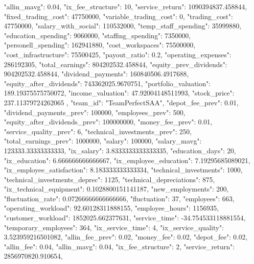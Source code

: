 {{            "allin_mavg": 0.04,
            "ix_fee_structure": 10,
            "service_return": 1090394837.458844,
            "fixed_trading_cost": 47750000,
            "variable_trading_cost": 0,
            "trading_cost": 47750000,
            "salary_with_social": 110532000,
            "temp_staff_spending": 35999880,
            "education_spending": 9060000,
            "staffing_spending": 7350000,
            "personell_spending": 162941880,
            "cost_workspaces": 75500000,
            "cost_infrastructure": 75500425,
            "payout_ratio": 0.2,
            "operating_expenses": 286192305,
            "total_earnings": 804202532.458844,
            "equity_prev_dividends": 904202532.458844,
            "dividend_payments": 160840506.4917688,
            "equity_after_dividends": 743362025.9670751,
            "portfolio_valuation": 189.19375575750072,
            "income_valuation": 47.92004148511993,
            "stock_price": 237.11379724262065
        },
        {
            "team_id": "TeamPerfectSAA",
            "depot_fee_prev": 0.01,
            "dividend_payments_prev": 100000,
            "employees_prev": 500,
            "equity_after_dividends_prev": 100000000,
            "money_fee_prev": 0.01,
            "service_quality_prev": 6,
            "technical_investments_prev": 250,
            "total_earnings_prev": 1000000,
            "salary": 100000,
            "salary_mavg": 123333.33333333333,
            "ix_salary": 3.8333333333333335,
            "education_days": 20,
            "ix_education": 6.666666666666667,
            "ix_employee_education": 7.19295685089021,
            "ix_employee_satisfaction": 8.183333333333334,
            "technical_investments": 1000,
            "technical_investments_deprec": 1125,
            "technical_depreciations": 875,
            "ix_technical_equipment": 0.1028800151141187,
            "new_employments": 200,
            "fluctuation_rate": 0.07266666666666666,
            "fluctuation": 37,
            "employees": 663,
            "operating_workload": 92.60128311888155,
            "employee_hours": 1156935,
            "customer_workload": 1852025.662377631,
            "service_time": -34.754533118881554,
            "temporary_employees": 364,
            "ix_service_time": 4,
            "ix_service_quality": 3.523959216501082,
            "allin_fee_prev": 0.02,
            "money_fee": 0.02,
            "depot_fee": 0.02,
            "allin_fee": 0.04,
            "allin_mavg": 0.04,
            "ix_fee_structure": 2,
            "service_return": 2856970820.910654,
}}
